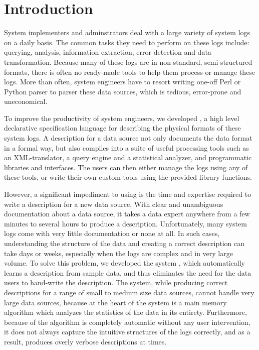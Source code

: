 \section{Introduction}
\label{sec:intro}

System implementers and adminstrators deal with a large variety of system logs on a
daily basis. The common tasks they need to perform on these logs include: querying,
analysis, information extraction, error detection and data transformation.
Because many of these logs are in non-standard, semi-structured formats,
there is often no ready-made tools to help them process or manage these logs.
More than often, system engineers have to resort writing one-off
Perl or Python parser to parser these data sources, which is tedious,
error-prone and uneconomical. 

To improve the productivity of system engineers, we developed \pads
\cite{fisher+:pads,fisher+:popl06,mandelbaum+:pads-ml,padsweb},
a high level declarative specification language for describing the
physical formats of these system logs. A \pads{} description for a data
source not only documents the data format in a formal way, but also
compiles into a suite of useful processing tools such as an XML-translator,
a query engine and a statistical analyzer, and programmatic
libraries and interfaces. The users can then either manage the logs using
any of these tools, or write their own custom tools using the provided 
library functions. 

However, a significant impediment to using \pads{} is the time and 
expertise required to write a \pads{} description for a new data source.
With clear and unambiguous documentation about a data source, it takes a data 
expert anywhere from a few minutes to several hours to produce a description. 
Unfortunately, many system logs come with very little documentation or none at all.
In such cases, understanding the structure of the data and creating a correct
description can take days or weeks, especially when the logs are complex and in
very large volume. To solve this problem, we developed the \learnpads{} system
\cite{Fisher+:dirttoshovels,fisher+:sigmod08,xi08:tokenization}, which automatically
learns a \pads{} description from sample data, and thus eliminates the need
for the data users to hand-write the description. The \learnpads{} system,
while producing correct descriptions for a range of small to medium size data sources,
cannot handle very large data sources, because at the heart of the system is a
main memory algorithm which analyzes the statistics of the data in its entirety. 
Furthermore, because of the algorithm is completely automatic without any user
intervention, it does not always capture the intuitive structures of the logs
correctly, and as a result, produces overly verbose descriptions at times.

